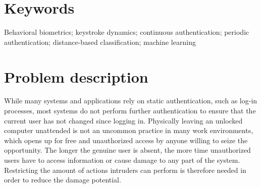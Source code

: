 \documentclass[informationsecurity]{gucmasterproject}
\begin{document}
\section{Keywords}
Behavioral biometrics; keystroke dynamics; continuous authentication; periodic authentication; distance-based classification; machine learning 
%

\section{Problem description}
While many systems and applications rely on static authentication, such as log-in processes, most systems do not perform further authentication to ensure that the current user has not changed since logging in.
Physically leaving an unlocked computer unattended is not an uncommon practice in many work environments, which opens up for free and unauthorized access by anyone willing to seize the opportunity.
The longer the genuine user is absent, the more time unauthorized users have to access information or cause damage to any part of the system.
Restricting the amount of actions intruders can perform is therefore needed in order to reduce the damage potential.
\end{document}
